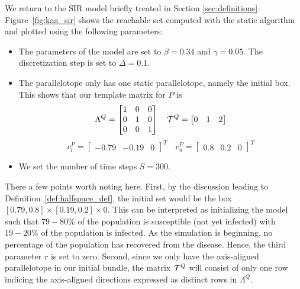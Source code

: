 \begin{example}
  We return to the SIR model briefly treated in Section \ref{sec:definitions}. Figure~\ref{fig:kaa_sir} shows the reachable set computed with the static algorithm and plotted using the following parameters:
  \begin{itemize}
    \item The parameters of the model are set to $\beta = 0.34$ and $\gamma = 0.05$. The discretization step is set to $\Delta = 0.1$.
    \item The parallelotope only has one static parallelotope, namely the initial box. This shows that our template matrix for $P$ is
        \begin{equation*}
          \Lambda^Q = \begin{bmatrix}
                      1 & 0 & 0 \\
                      0 & 1 & 0 \\
                      0 & 0 & 1
                      \end{bmatrix}
                      \quad
          \mathcal{T}^Q = \begin{bmatrix}
                      0 & 1 & 2 \\
                      \end{bmatrix}
        \end{equation*}
        \begin{equation*}
            c_l^P = \begin{bmatrix} -0.79 & -0.19 & 0 \end{bmatrix}^T \quad c_u^P = \begin{bmatrix} 0.8 & 0.2 & 0 \end{bmatrix}^T
        \end{equation*}
    \item We set the number of time steps $S = 300$.
  \end{itemize}

  There a few points worth noting here. First, by the discussion leading to Definition~\ref{def:halfspace_def}, the initial set would be the box $[0.79,0.8] \times [0.19, 0.2] \times 0$. This can be interpreted as initializing the model such that $79-80\%$ of the population is susceptible (not yet infected) with $19-20\%$ of the population is infected. As the simulation is beginning, no percentage of the population has recovered from the disease. Hence, the third parameter $r$ is set to zero.
  Second, since we only have the axis-aligned parallelotope in our initial bundle, the matrix $\mathcal{T}^Q$ will consist of only one row indicing the axis-aligned directions expressed as distinct rows in $\Lambda^Q$.
\end{example}

